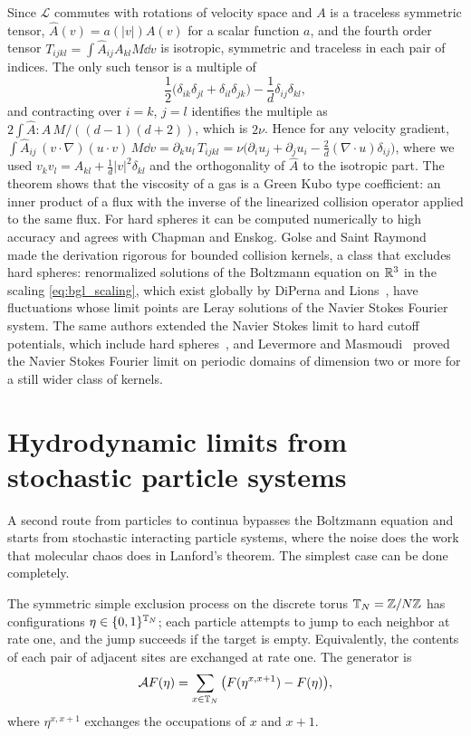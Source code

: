 Since $\mathcal{L}$ commutes with rotations of velocity space and $A$ is a traceless symmetric tensor, $\hat A(v) = a(|v|)A(v)$ for a scalar function $a$, and the fourth order tensor $T_{ijkl} = \int\hat A_{ij}A_{kl}M\dd v$ is isotropic, symmetric and traceless in each pair of indices. The only such tensor is a multiple of
\[
\frac12\big(\delta_{ik}\delta_{jl}+\delta_{il}\delta_{jk}\big)-\frac1d\delta_{ij}\delta_{kl},
\]
and contracting over $i = k$, $j = l$ identifies the multiple as $2\int\hat A:A\,M/((d-1)(d+2))$, which is $2\nu$. Hence for any velocity gradient, $\int\hat A_{ij}\,(v\cdot\nabla)(u\cdot v)\,M\dd v = \partial_ku_l\,T_{ijkl} = \nu\big(\partial_iu_j+\partial_ju_i-\frac2d(\nabla\cdot u)\delta_{ij}\big)$, where we used $v_kv_l = A_{kl}+\frac1d|v|^2\delta_{kl}$ and the orthogonality of $\hat A$ to the isotropic part. The theorem shows that the viscosity of a gas is a Green Kubo type coefficient: an inner product of a flux with the inverse of the linearized collision operator applied to the same flux. For hard spheres it can be computed numerically to high accuracy and agrees with Chapman and Enskog. Golse and Saint Raymond~\cite{golsesaintraymond2004} made the derivation rigorous for bounded collision kernels, a class that excludes hard spheres: renormalized solutions of the Boltzmann equation on $\mathbb{R}^3$ in the scaling \eqref{eq:bgl_scaling}, which exist globally by DiPerna and Lions~\cite{diperna1989}, have fluctuations whose limit points are Leray solutions of the Navier Stokes Fourier system. The same authors extended the Navier Stokes limit to hard cutoff potentials, which include hard spheres~\cite{golsesaintraymond2009}, and Levermore and Masmoudi~\cite{levermoremasmoudi2010} proved the Navier Stokes Fourier limit on periodic domains of dimension two or more for a still wider class of kernels.

\section{Hydrodynamic limits from stochastic particle systems}
\label{sec:particle_hydro}

A second route from particles to continua bypasses the Boltzmann equation and starts from stochastic interacting particle systems, where the noise does the work that molecular chaos does in Lanford's theorem. The simplest case can be done completely.

The symmetric simple exclusion process on the discrete torus $\mathbb{T}_N = \mathbb{Z}/N\mathbb{Z}$ has configurations $\eta\in\{0,1\}^{\mathbb{T}_N}$; each particle attempts to jump to each neighbor at rate one, and the jump succeeds if the target is empty. Equivalently, the contents of each pair of adjacent sites are exchanged at rate one. The generator is
\[
\mathcal{A}F(\eta) = \sum_{x\in\mathbb{T}_N}\big(F(\eta^{x,x+1})-F(\eta)\big),
\]
where $\eta^{x,x+1}$ exchanges the occupations of $x$ and $x+1$.

